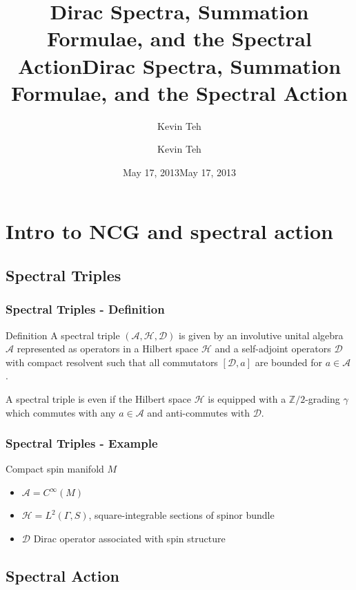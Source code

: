 \documentclass{beamer}
\title{Dirac Spectra, Summation Formulae, and the Spectral Action} \author{Kevin Teh} \date{May 17, 2013}
\title{Dirac Spectra, Summation Formulae, and the Spectral Action}
\author{Kevin Teh}
\institute{Caltech}
\date{May 17, 2013}
\def\Z{{\mathbb Z}}
\def\cA{{\mathcal A}}
\def\cD{{\mathcal D}}
\def\cH{{\mathcal H}}
\begin{document}
\begin{frame}
\titlepage
\end{frame}

\section{Intro to NCG and spectral action}

\subsection{Spectral Triples}
\begin{frame}
	\frametitle{Spectral Triples - Definition}
	\begin{block}{Definition}
		A spectral triple $(\cA, \cH, \cD)$ is given by an involutive unital algebra $\cA$ represented as operators in a Hilbert space $\cH$ and a self-adjoint operators $\cD$ with compact resolvent such that all commutators $[\cD, a]$ are bounded for $a \in \cA$.
	\end{block}
	\pause

	\begin{block}{}
		A spectral triple is even if the Hilbert space $\cH$ is equipped with a $\Z /2 $-grading $\gamma$ which commutes with any $a \in \cA$ and anti-commutes with $\cD$.
\end{block}
\end{frame}


\begin{frame}
	\frametitle{Spectral Triples - Example}
	\begin{exampleblock}{Compact spin manifold $M$}
		\begin{itemize}
			\item $\cA = C^{\infty}(M)$
			\item $\cH = L^2(\Gamma, S)$, square-integrable sections of spinor bundle
			\item $\cD$ Dirac operator associated with spin structure
		\end{itemize}
	\end{exampleblock}
\end{frame}

\subsection{Spectral Action}
\end{document}
